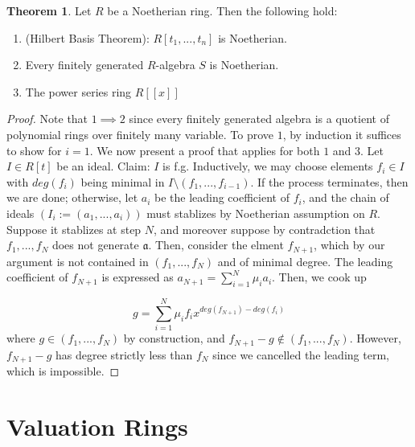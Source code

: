 \documentclass{article}
\theoremstyle{definition}
\newtheorem{theorem}{Theorem}[section]
\theoremstyle{definition}
\theoremstyle{definition}
\theoremstyle{definition}
\theoremstyle{definition}
\theoremstyle{definition}
\theoremstyle{definition}
\begin{document}
\begin{tcolorbox}[colback=red!5!white,colframe=red!30!white]
\begin{theorem}
Let $R$ be a Noetherian ring. Then the following hold:
\begin{enumerate}
    \item (Hilbert Basis Theorem): $R[t_1,...,t_n]$ is Noetherian. 
    \item Every finitely generated $R$-algebra $S$ is Noetherian. 
    \item The power series ring $R[[x]]$
\end{enumerate}
\end{theorem}
\end{tcolorbox}
\begin{proof}
    Note that $1\implies 2$ since every finitely generated algebra is a quotient of polynomial rings over finitely many variable. To prove $1$, by induction it suffices to show for $i=1$. We now present a proof that applies for both $1$ and $3$. Let $I\in R[t]$ be an ideal. Claim: $I$ is f.g. Inductively, we may choose elements $f_i\in I$ with $deg(f_{i})$ being minimal in $I\setminus (f_1,...,f_{i-1})$. If the process terminates, then we are done; otherwise, let $a_i$ be the leading coefficient of $f_i$, and the chain of ideals $(I_i:=(a_1,...,a_i))$ must stablizes by Noetherian assumption on $R$. Suppose it stablizes at step $N$, and moreover suppose by contradction that $f_1,...,f_N$ does not generate $\mathfrak{a}$. Then, consider the elment $f_{N+1}$, which by our argument is not contained in $(f_1,...,f_N)$ and of minimal degree. The leading coefficient of $f_{N+1}$ is expressed as $a_{N+1}=\sum_{i=1}^{N}\mu_ia_i$. Then, we cook up 

    \[g=\sum_{i=1}^{N}\mu_if_ix^{deg(f_{N+1})-deg(f_i)}\]
    where $g\in (f_1,...,f_N)$ by construction, and $f_{N+1}-g\not\in (f_1,...,f_N)$. However, $f_{N+1}-g$ has degree strictly less than $f_{N}$ since we cancelled the leading term, which is impossible. 
\end{proof}

\section{Valuation Rings}
\end{document}
